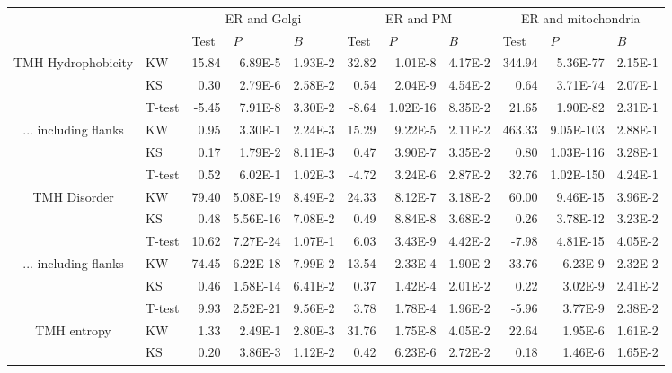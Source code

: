 \begin{table}[htbp]
	\begin{tabular}{clrrrrrrrrr}
							&       & \multicolumn{3}{c}{ER and Golgi} & \multicolumn{3}{c}{ER and PM} & \multicolumn{3}{c}{ER and mitochondria} \\
							&       & \multicolumn{1}{l}{Test} & \multicolumn{1}{l}{$P$} & \multicolumn{1}{l}{$B$} & \multicolumn{1}{l}{Test} & \multicolumn{1}{l}{$P$} & \multicolumn{1}{l}{$B$} & \multicolumn{1}{l}{Test} & \multicolumn{1}{l}{$P$} & \multicolumn{1}{l}{$B$} \\
	\midrule
	\multirow{3}[0]{*}{TMH Hydrophobicity} &  KW & 15.84 & 6.89E-5 & 1.93E-2 & 32.82 & 1.01E-8 & 4.17E-2 & 344.94 & 5.36E-77 & 2.15E-1 \\
							&  KS & 0.30  & 2.79E-6 & 2.58E-2 & 0.54  & 2.04E-9 & 4.54E-2 & 0.64  & 3.71E-74 & 2.07E-1 \\
							&  T-test & -5.45 & 7.91E-8 & 3.30E-2 & -8.64 & 1.02E-16 & 8.35E-2 & 21.65 & 1.90E-82 & 2.31E-1 \\
	\midrule
	\multirow{3}[0]{*}{... including flanks} &  KW & 0.95  & 3.30E-1 & 2.24E-3 & 15.29 & 9.22E-5 & 2.11E-2 & 463.33 & 9.05E-103 & 2.88E-1 \\
							&  KS & 0.17  & 1.79E-2 & 8.11E-3 & 0.47  & 3.90E-7 & 3.35E-2 & 0.80  & 1.03E-116 & 3.28E-1 \\
							&  T-test & 0.52  & 6.02E-1 & 1.02E-3 & -4.72 & 3.24E-6 & 2.87E-2 & 32.76 & 1.02E-150 & 4.24E-1 \\
	\midrule
	\multirow{3}[0]{*}{TMH Disorder} &  KW & 79.40 & 5.08E-19 & 8.49E-2 & 24.33 & 8.12E-7 & 3.18E-2 & 60.00 & 9.46E-15 & 3.96E-2 \\
							&  KS & 0.48  & 5.56E-16 & 7.08E-2 & 0.49  & 8.84E-8 & 3.68E-2 & 0.26  & 3.78E-12 & 3.23E-2 \\
							&  T-test & 10.62 & 7.27E-24 & 1.07E-1 & 6.03  & 3.43E-9 & 4.42E-2 & -7.98 & 4.81E-15 & 4.05E-2 \\
	\midrule
	\multirow{3}[0]{*}{... including flanks} &  KW & 74.45 & 6.22E-18 & 7.99E-2 & 13.54 & 2.33E-4 & 1.90E-2 & 33.76 & 6.23E-9 & 2.32E-2 \\
							&  KS & 0.46  & 1.58E-14 & 6.41E-2 & 0.37  & 1.42E-4 & 2.01E-2 & 0.22  & 3.02E-9 & 2.41E-2 \\
							&  T-test & 9.93  & 2.52E-21 & 9.56E-2 & 3.78  & 1.78E-4 & 1.96E-2 & -5.96 & 3.77E-9 & 2.38E-2 \\
	\midrule
	\multirow{3}[0]{*}{TMH entropy} &  KW & 1.33  & 2.49E-1 & 2.80E-3 & 31.76 & 1.75E-8 & 4.05E-2 & 22.64 & 1.95E-6 & 1.61E-2 \\
							&  KS & 0.20  & 3.86E-3 & 1.12E-2 & 0.42  & 6.23E-6 & 2.72E-2 & 0.18  & 1.46E-6 & 1.65E-2 \\

\end{tabular}
\end{table}
